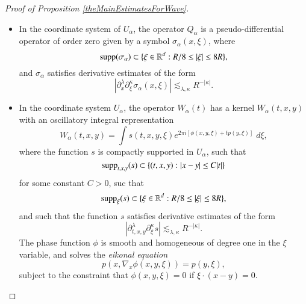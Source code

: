 \begin{proof}[Proof of Proposition \ref{theMainEstimatesForWave}]
\begin{lemma}
\begin{itemize}
        \item In the coordinate system of $U_\alpha$, the operator $Q_{\alpha}$ is a pseudo-differential operator of order zero given by a symbol $\sigma_{\alpha}(x,\xi)$, where
        \begin{equation}
            \operatorname{\text{supp}}(\sigma_{\alpha}) \subset \{ \xi \in \operatorname{\mathbb{R}}^d: R/8 \leq |\xi| \leq 8R \},
        \end{equation}
        and $\sigma_{\alpha}$ satisfies derivative estimates of the form
        \begin{equation}
            |\partial^\lambda_x \partial^\kappa_\xi \sigma_{\alpha}(x,\xi)| \lesssim_{\lambda,\kappa} R^{-|\kappa|}.
        \end{equation}

        \item In the coordinate system $U_\alpha$, the operator $W_\alpha(t)$ has a kernel $W_\alpha(t,x,y)$ with an oscillatory integral representation
        \begin{equation}
            W_\alpha(t,x,y) = \int s(t,x,y,\xi) e^{2 \pi i [ \phi(x,y,\xi) + t p(y,\xi) ]}\; d\xi,
        \end{equation}
        where the function $s$ is compactly supported in $U_\alpha$, such that
        \begin{equation}
            \operatorname{\text{supp}}_{t,x,y}(s) \subset \{ (t,x,y) : |x - y| \leq C |t| \}
        \end{equation}
        for some constant $C > 0$, suc that
        \begin{equation}
            \operatorname{\text{supp}}_\xi(s) \subset \{ \xi \in \operatorname{\mathbb{R}}^d : R/8 \leq |\xi| \leq 8R \}, 
        \end{equation}
        and such that the function $s$ satisfies derivative estimates of the form
        \begin{equation}
            | \partial_{t,x,y}^\lambda \partial_\xi^\kappa s | \lesssim_{\lambda, \kappa} R^{- |\kappa|}.
        \end{equation}
        The phase function $\phi$ is smooth and homogeneous of degree one in the $\xi$ variable, and solves the \emph{eikonal equation}
        \begin{equation}
            p \left( x, \nabla_x \phi(x,y,\xi) \right) = p(y,\xi),
        \end{equation}
        subject to the constraint that $\phi(x,y,\xi) = 0$ if $\xi \cdot (x - y) = 0$.
    \end{itemize}
\end{lemma}


\end{proof}
